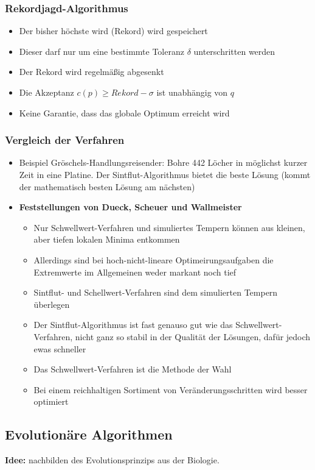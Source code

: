 \subsubsection{Rekordjagd-Algorithmus}
\begin{itemize}
	\item Der bisher höchste wird (Rekord) wird gespeichert
	\item Dieser darf nur um eine bestimmte Toleranz \(\delta\) unterschritten werden
	\item Der Rekord wird regelmäßig abgesenkt
	\item Die Akzeptanz \(c(p) \geq Rekord-\sigma\) ist unabhängig von \(q\)
	\item Keine Garantie, dass das globale Optimum erreicht wird
\end{itemize}

\subsubsection{Vergleich der Verfahren}
\begin{itemize}
	\item Beispiel Gröschels-Handlungsreisender: Bohre 442 Löcher in möglichst kurzer Zeit in eine Platine. Der Sintflut-Algorithmus bietet die beste Lösung (kommt der mathematisch besten Lösung am nächsten)
	\item \textbf{Feststellungen von Dueck, Scheuer und Wallmeister}
	\begin{itemize}
		\item Nur Schwellwert-Verfahren und simuliertes Tempern können aus kleinen, aber tiefen lokalen Minima entkommen
		\item Allerdings sind bei hoch-nicht-lineare Optimeirungsaufgaben die Extremwerte im Allgemeinen weder markant noch tief
		\item Sintflut- und Schellwert-Verfahren sind dem simulierten Tempern überlegen
		\item Der Sintflut-Algorithmus ist fast genauso gut wie das Schwellwert-Verfahren, nicht ganz so stabil in der Qualität der Lösungen, dafür jedoch ewas schneller
		\item Das Schwellwert-Verfahren ist die Methode der Wahl
		\item Bei einem reichhaltigen Sortiment von Veränderungsschritten wird besser optimiert
	\end{itemize}
\end{itemize}


\subsection{Evolutionäre Algorithmen}
\textbf{Idee:} nachbilden des Evolutionsprinzips aus der Biologie.

